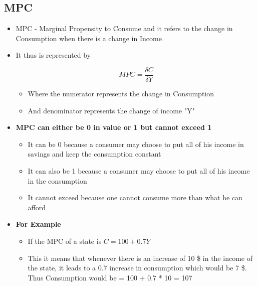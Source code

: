 \documentclass[11pt]{article}
\begin{document}
\subsection{MPC}
\label{sec:orgffdcb37}
\begin{itemize}
\item MPC - Marginal Propensity to Consume and it refers to the change in Consumption when there is a change in Income
\item It thus is represented by

$$
  MPC = \frac{\delta C}{\delta Y}
  $$

\begin{itemize}
\item Where the numerator represents the change in Consumption

\item And denominator represents the change of income "Y"
\end{itemize}
\item \textbf{MPC can either be 0 in value or 1 but cannot exceed 1}
\begin{itemize}
\item It can be 0 because a consumer may choose to put all of his income in savings and keep the consumption constant

\item It can also be 1 because a consumer may choose to put all of his income in the consumption

\item It cannot exceed because one cannot consume more than what he can afford
\end{itemize}
\item \textbf{For Example}
\begin{itemize}
\item If the MPC of a state is \(C = 100 + 0.7Y\)

\item This it means that whenever there is an increase of 10 \$ in the income of the state, it leads to a 0.7 increase in consumption which would be 7 \$. Thus Consumption would be =  100 + 0.7 * 10 = 107
\end{itemize}
\end{itemize}
\end{document}
